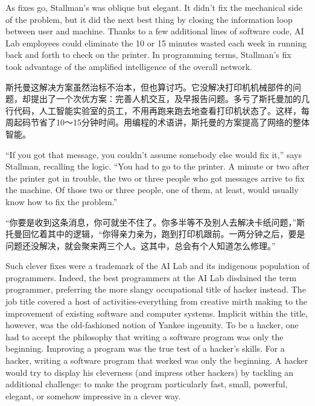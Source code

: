 \ifdefined\eng
As fixes go, Stallman's was oblique but elegant. It didn't fix the mechanical side of the problem, but it did the next best thing by closing the information loop between user and machine. Thanks to a few additional lines of software code, AI Lab employees could eliminate the 10 or 15 minutes wasted each week in running back and forth to check on the printer. In programming terms, Stallman's fix took advantage of the amplified intelligence of the overall network.
\fi

\ifdefined\chs
斯托曼这解决方案虽然治标不治本，但也算讨巧。它没解决打印机机械部件的问题，却提出了一个次优方案：完善人机交互，及早报告问题。多亏了斯托曼加的几行代码，人工智能实验室的员工，不用再跑来跑去地查看打印机状态了。这样，每周起码节省了10～15分钟时间。用编程的术语讲，斯托曼的方案提高了网络的整体智能。
\fi

\ifdefined\eng
``If you got that message, you couldn't assume somebody else would fix it,'' says Stallman, recalling the logic. ``You had to go to the printer. A minute or two after the printer got in trouble, the two or three people who got messages arrive to fix the machine. Of those two or three people, one of them, at least, would usually know how to fix the problem.''
\fi

\ifdefined\chs
``你要是收到这条消息，你可就坐不住了。你多半等不及别人去解决卡纸问题，''斯托曼回忆着其中的逻辑，``你得亲力亲为，跑到打印机跟前。一两分钟之后，要是问题还没解决，就会聚来两三个人。这其中，总会有个人知道怎么修理。''
\fi

\ifdefined\eng
Such clever fixes were a trademark of the AI Lab and its indigenous population of programmers. Indeed, the best programmers at the AI Lab disdained the term programmer, preferring the more slangy occupational title of hacker instead. The job title covered a host of activities-everything from creative mirth making to the improvement of existing software and computer systems. Implicit within the title, however, was the old-fashioned notion of Yankee ingenuity.
\ifdefined\vone
To be a hacker, one had to accept the philosophy that writing a software program was only the beginning. Improving a program was the true test of a hacker's skills.
\fi
\ifdefined\vtwo
For a hacker, writing a software program that worked was only the beginning. A hacker would try to display his cleverness (and impress other hackers) by tackling an additional challenge: to make the program particularly fast, small, powerful, elegant, or somehow impressive in a clever way.
\fi
{}
\fi

